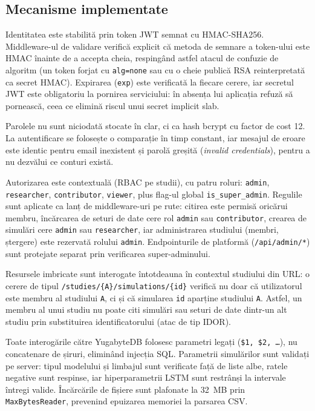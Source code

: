 \subsection{Mecanisme implementate}
\label{subsec:sec_mecanisme}

Identitatea este stabilită prin token JWT semnat cu HMAC-SHA256.
Middleware-ul de validare verifică explicit că metoda de semnare a
token-ului este HMAC înainte de a accepta cheia, respingând astfel atacul
de confuzie de algoritm (un token forjat cu \texttt{alg=none} sau cu o
cheie publică RSA reinterpretată ca secret HMAC). Expirarea (\texttt{exp})
este verificată la fiecare cerere, iar secretul JWT este obligatoriu la
pornirea serviciului: în absența lui aplicația refuză să pornească, ceea
ce elimină riscul unui secret implicit slab.

Parolele nu sunt niciodată stocate în clar, ci ca hash bcrypt cu factor de
cost 12. La autentificare se folosește o comparație în timp constant, iar
mesajul de eroare este identic pentru email inexistent și parolă greșită
(\emph{invalid credentials}), pentru a nu dezvălui ce conturi există.

Autorizarea este contextuală (RBAC pe studii), cu patru roluri:
\texttt{admin}, \texttt{researcher}, \texttt{contributor}, \texttt{viewer},
plus flag-ul global \texttt{is\_super\_admin}. Regulile sunt aplicate ca
lanț de middleware-uri pe rute: citirea este permisă oricărui membru,
încărcarea de seturi de date cere rol \texttt{admin} sau
\texttt{contributor}, crearea de simulări cere \texttt{admin} sau
\texttt{researcher}, iar administrarea studiului (membri, ștergere) este
rezervată rolului \texttt{admin}. Endpointurile de platformă
(\texttt{/api/admin/*}) sunt protejate separat prin verificarea
super-adminului.

Resursele imbricate sunt interogate întotdeauna în contextul studiului
din URL: o cerere de tipul \texttt{/studies/\{A\}/simulations/\{id\}}
verifică nu doar că utilizatorul este membru al studiului \texttt{A}, ci
și că simularea \texttt{id} aparține studiului \texttt{A}. Astfel, un
membru al unui studiu nu poate citi simulări sau seturi de date dintr-un
alt studiu prin substituirea identificatorului (atac de tip IDOR).

Toate interogările către YugabyteDB folosesc parametri legați
(\texttt{\$1, \$2, \dots}), nu concatenare de șiruri, eliminând injecția
SQL. Parametrii simulărilor sunt validați pe server: tipul modelului și
limbajul sunt verificate față de liste albe, ratele negative sunt
respinse, iar hiperparametrii LSTM sunt restrânși la intervale întregi
valide. Încărcările de fișiere sunt plafonate la 32~MB prin
\texttt{MaxBytesReader}, prevenind epuizarea memoriei la parsarea CSV.

